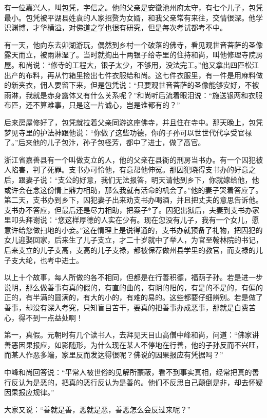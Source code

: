 \documentclass[12pt,UTF8]{ctexbook}
\begin{document}
有一位嘉兴人，叫包凭，字信之。他的父亲是安徽池州府太守，有七个儿子，包凭最小。包凭被平湖县姓袁的人家招赘为女婿，和我父亲常有来往，交情很深。他学识渊博，才华横溢，对佛道之学也很有研究，但是每次考试都考不中。

有一天，他向东去卯湖游玩，偶然到乡村一个破落的佛寺，看见观世音菩萨的圣像露天而立，被雨淋湿了。当时就掏出十两银子给寺里的住持和尚，叫他修理寺院房屋。和尚说：“修寺的工程大，银子太少，不够用，没法完工。”他又拿出四匹松江出产的布料，再从竹箱里捡出七件衣服给和尚。这七件衣服里，有一件是用麻料做的新夹衣，佣人要留下来，但是包凭说：“只要观世音菩萨的圣像能够安好，不被雨淋，我就是赤身露体又有什么关系呢？”和尚听后流着眼泪说：“施送银两和衣服布匹，还不算难事，只是这一片诚心，岂是谁都有的？”

后来房屋修好了，包凭就拉着父亲同游这座佛寺，并且住在寺中。那天晚上，包凭梦见寺里的护法神跟他说：“你做了这些功德，你的子孙可以世世代代享受官禄了。”后来他的儿子包汴，孙子包柽芳，都中了进士，做了高官。

浙江省嘉善县有一个叫做支立的人，他的父亲在县衙的刑房当书办。有一个囚犯被人陷害，判了死罪。支书办可怜他，有意帮他伸冤。那囚犯晓得支书办的好意之后，跟妻子说：“支公的好意，我们无法报答，明天请他到乡下，你就嫁给他，他或许会在念这份情上鼎力相助，那么我就有活命的机会了。”他的妻子哭着答应了。第二天，支书办到乡下，囚犯妻子出来劝支书办喝酒，并且把丈夫的意思告诉他。支书办不答应，但最后还是尽力相助，把案子*了。囚犯出狱后，夫妻到支书办家里叩头拜谢说：“您这样厚德的人实在少有。现在您没有儿子，我有一个女儿，愿意许给您做扫地的小妾。”这在情理上是说得通的，支书办就预备了礼物，把囚犯的女儿迎娶回家，后来生了儿子支立，才二十岁就中了举人，为官至翰林院的书记，后来支立的儿子支高，支高的儿子支禄，都被保荐做州县学里的教官，而支禄的儿子支大纶，也考中进士。

以上十个故事，每人所做的各不相同，但都是在行善积德，福荫子孙。若是进一步说明，那么做善事有真的假的，有直的曲的，有阴的阳的，有是的不是的，有偏的正的，有半满的圆满的，有大的小的，有难的易的。这些都要仔细辨别。若是做了善事，却没有深入考究，只知盲目苦干，要真的把善事办成恶事，那就是白费苦心，得不到一点益处啊！

第一，真假。元朝时有几个读书人，去拜见天目山高僧中峰和尚，问道：“佛家讲善恶因果报应，如影随形，为什么现在某人不停地在行善，他的子孙反而不兴旺，而某人作恶多端，家里反而发达得很呢？佛说的因果报应有凭据吗？”

中峰和尚回答说：“平常人被世俗的见解所蒙蔽，看不到事实真相，经常把真的善行反认为是恶的，把真的恶行反认为是善的。他们不反思自己颠倒是非，却去怀疑因果报应规律。”

大家又说：“善就是善，恶就是恶，善恶怎么会反过来呢？”
\end{document}
